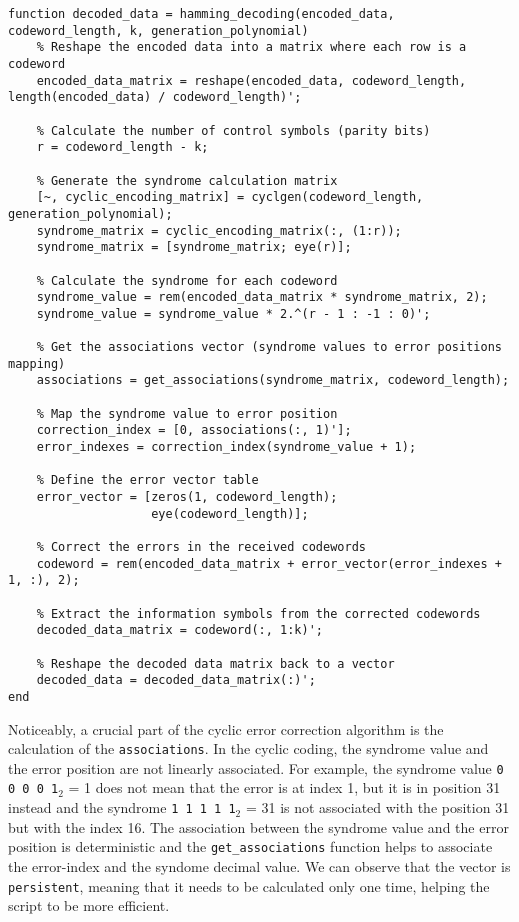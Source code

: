 \begin{lstlisting}
function decoded_data = hamming_decoding(encoded_data, codeword_length, k, generation_polynomial)
    % Reshape the encoded data into a matrix where each row is a codeword
    encoded_data_matrix = reshape(encoded_data, codeword_length, length(encoded_data) / codeword_length)';

    % Calculate the number of control symbols (parity bits)
    r = codeword_length - k;
    
    % Generate the syndrome calculation matrix
    [~, cyclic_encoding_matrix] = cyclgen(codeword_length, generation_polynomial);
    syndrome_matrix = cyclic_encoding_matrix(:, (1:r));
    syndrome_matrix = [syndrome_matrix; eye(r)];
    
    % Calculate the syndrome for each codeword
    syndrome_value = rem(encoded_data_matrix * syndrome_matrix, 2);
    syndrome_value = syndrome_value * 2.^(r - 1 : -1 : 0)';
    
    % Get the associations vector (syndrome values to error positions mapping)
    associations = get_associations(syndrome_matrix, codeword_length);
    
    % Map the syndrome value to error position
    correction_index = [0, associations(:, 1)'];
    error_indexes = correction_index(syndrome_value + 1);
    
    % Define the error vector table
    error_vector = [zeros(1, codeword_length);
                    eye(codeword_length)];
    
    % Correct the errors in the received codewords
    codeword = rem(encoded_data_matrix + error_vector(error_indexes + 1, :), 2);
    
    % Extract the information symbols from the corrected codewords
    decoded_data_matrix = codeword(:, 1:k)';
    
    % Reshape the decoded data matrix back to a vector
    decoded_data = decoded_data_matrix(:)';
end
\end{lstlisting}

\noindent Noticeably, a crucial part of the cyclic error correction algorithm is the calculation of the \texttt{associations}. In the cyclic coding, the syndrome value and the error position are not linearly associated. For example, the syndrome value \texttt{0 0 0 0 1}$_2$ = 1 does not mean that the error is at index 1, but it is in position 31 instead and the syndrome \texttt{1 1 1 1 1}$_2$ = 31 is not associated with the position 31 but with the index 16. The association between the syndrome value and the error position is deterministic and the \texttt{get\_associations} function helps to associate the error-index and the syndome decimal value. We can observe that the vector is \texttt{persistent}, meaning that it needs to be calculated only one time, helping the script to be more efficient.

